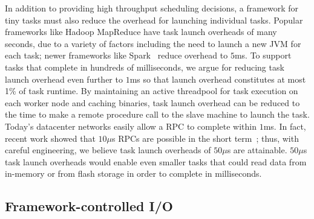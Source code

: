 In addition to providing high throughput scheduling decisions, a framework for
tiny tasks must also reduce the overhead for launching individual tasks.
Popular frameworks like Hadoop MapReduce have task launch overheads of many
seconds, due to a variety of factors including the need to launch a new
JVM for each task; newer frameworks like Spark~\cite{zaharia2010spark} reduce
overhead to $5$ms.
To support tasks that complete in hundreds of milliseconds, we argue for
reducing task launch overhead even further to $1$ms so that launch overhead
constitutes at most 1\% of task runtime.
By maintaining an active threadpool for task execution on each worker node
and caching binaries, task launch overhead can be reduced to the time to
make
 a remote procedure
call to the slave machine to launch the task. Today's datacenter networks
easily allow a RPC to complete within $1$ms. In fact, recent work showed that
$10\mu$s RPCs are possible in the short term~\cite{low-latency}; thus,
with careful engineering, we believe task launch overheads of $50\mu$s are
attainable. $50\mu$s task launch overheads would enable even smaller tasks
that could read data from in-memory or from flash storage in order to complete
in milliseconds.
\subsection{Framework-controlled I/O}
\label{sec:pipeline}

